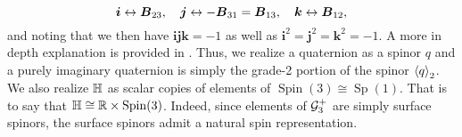 \begin{equation}
\boldsymbol{i} \leftrightarrow \blade{B}_{23}, \quad \boldsymbol{j} \leftrightarrow -\blade{B}_{31}=\blade{B}_{13}, \quad \boldsymbol{k} \leftrightarrow \blade{B}_{12},
\end{equation}
and noting that we then have $\boldsymbol{ijk}=-1$ as well as $\boldsymbol{i}^2=\boldsymbol{j}^2=\boldsymbol{k}^2=-1$. A more in depth explanation is provided in \cite{doran_geometric_2003}. Thus, we realize a quaternion as a spinor $q$ and a purely imaginary quaternion is simply the grade-2 portion of the spinor $\proj{2}{q}$. We also realize $\quat$ as scalar copies of elements of $\operatorname{Spin}(3) \cong \operatorname{Sp}(1)$. That is to say that $\quat \cong \R \times \operatorname{Spin}(3)$. Indeed, since elements of $\G_3^+$ are simply surface spinors, the surface spinors admit a natural spin representation.

